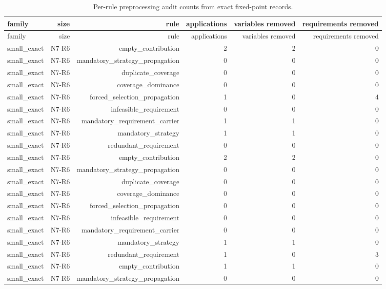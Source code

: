 {\footnotesize
\begin{longtable}{lrrrrr}
\caption{Per-rule preprocessing audit counts from exact fixed-point records.}\label{tab:aor-preprocessing-rules}\\
\toprule
family & size & rule & applications & variables removed & requirements removed \\
\midrule
\endfirsthead
\toprule
family & size & rule & applications & variables removed & requirements removed \\
\midrule
\endhead
small\_exact & N7-R6 & empty\_contribution & 2 & 2 & 0 \\
small\_exact & N7-R6 & mandatory\_strategy\_propagation & 0 & 0 & 0 \\
small\_exact & N7-R6 & duplicate\_coverage & 0 & 0 & 0 \\
small\_exact & N7-R6 & coverage\_dominance & 0 & 0 & 0 \\
small\_exact & N7-R6 & forced\_selection\_propagation & 1 & 0 & 4 \\
small\_exact & N7-R6 & infeasible\_requirement & 0 & 0 & 0 \\
small\_exact & N7-R6 & mandatory\_requirement\_carrier & 1 & 1 & 0 \\
small\_exact & N7-R6 & mandatory\_strategy & 1 & 1 & 0 \\
small\_exact & N7-R6 & redundant\_requirement & 0 & 0 & 0 \\
small\_exact & N7-R6 & empty\_contribution & 2 & 2 & 0 \\
small\_exact & N7-R6 & mandatory\_strategy\_propagation & 0 & 0 & 0 \\
small\_exact & N7-R6 & duplicate\_coverage & 0 & 0 & 0 \\
small\_exact & N7-R6 & coverage\_dominance & 0 & 0 & 0 \\
small\_exact & N7-R6 & forced\_selection\_propagation & 0 & 0 & 0 \\
small\_exact & N7-R6 & infeasible\_requirement & 0 & 0 & 0 \\
small\_exact & N7-R6 & mandatory\_requirement\_carrier & 0 & 0 & 0 \\
small\_exact & N7-R6 & mandatory\_strategy & 1 & 1 & 0 \\
small\_exact & N7-R6 & redundant\_requirement & 1 & 0 & 3 \\
small\_exact & N7-R6 & empty\_contribution & 1 & 1 & 0 \\
small\_exact & N7-R6 & mandatory\_strategy\_propagation & 0 & 0 & 0 \\

\end{longtable}}
